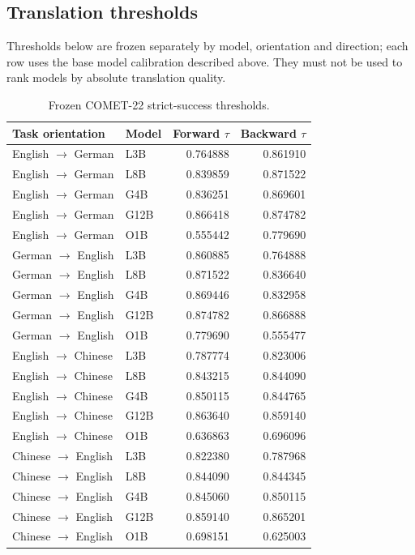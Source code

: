 \subsection{Translation thresholds}
Thresholds below are frozen separately by model, orientation and direction; each row uses the base model calibration described above. They must not be used to rank models by absolute translation quality.
\begin{table}[t]\centering\small
\begin{tabular}{llrr}\toprule Task orientation & Model & Forward $\tau$ & Backward $\tau$ \\\midrule
English $\to$ German & L3B & 0.764888 & 0.861910 \\
English $\to$ German & L8B & 0.839859 & 0.871522 \\
English $\to$ German & G4B & 0.836251 & 0.869601 \\
English $\to$ German & G12B & 0.866418 & 0.874782 \\
English $\to$ German & O1B & 0.555442 & 0.779690 \\
German $\to$ English & L3B & 0.860885 & 0.764888 \\
German $\to$ English & L8B & 0.871522 & 0.836640 \\
German $\to$ English & G4B & 0.869446 & 0.832958 \\
German $\to$ English & G12B & 0.874782 & 0.866888 \\
German $\to$ English & O1B & 0.779690 & 0.555477 \\
English $\to$ Chinese & L3B & 0.787774 & 0.823006 \\
English $\to$ Chinese & L8B & 0.843215 & 0.844090 \\
English $\to$ Chinese & G4B & 0.850115 & 0.844765 \\
English $\to$ Chinese & G12B & 0.863640 & 0.859140 \\
English $\to$ Chinese & O1B & 0.636863 & 0.696096 \\
Chinese $\to$ English & L3B & 0.822380 & 0.787968 \\
Chinese $\to$ English & L8B & 0.844090 & 0.844345 \\
Chinese $\to$ English & G4B & 0.845060 & 0.850115 \\
Chinese $\to$ English & G12B & 0.859140 & 0.865201 \\
Chinese $\to$ English & O1B & 0.698151 & 0.625003 \\
\bottomrule\end{tabular}
\caption{Frozen COMET-22 strict-success thresholds.}\label{tab:translation-thresholds}\end{table}
